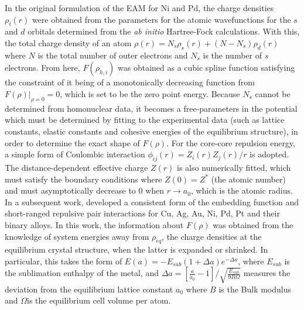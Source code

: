 In the original formulation of the EAM for Ni and Pd,\cite{daw1984embedded}  the  charge densities $\rho_i(r)$ were obtained from the parameters for the atomic wavefunctions for the $s$ and $d$ orbitals determined from the \emph{ab initio} Hartree-Fock calculations.\cite{clementi1974roothaan} With this, the total charge density of an atom $\rho(r)=N_s\rho_s(r)+(N-N_s)\rho_d (r)$ where $N$ is the total number of outer electrons and $N_s$ is the number of $s$ electrons.  From here, $F(\rho_{h,i})$ was obtained as a cubic spline function satisfying the constraint of it being of a monotonically decreasing function from $F(\rho)\vert_{\rho=0}=0$, which is set to be the zero point energy. Because  $N_s$ cannot be determined from homonuclear data, it becomes a free-parameters in the potential which must be determined by fitting to the experimental data (such as lattice constants, elastic constants and cohesive energies of the equilibrium structure), in order to determine the exact shape of $F(\rho)$. For the core-core repulsion energy, a simple form of Coulombic interaction $\phi_{ij}(r)=Z_i(r)Z_j(r)/r$ is adopted. The distance-dependent effective charge $Z(r)$ is also numerically fitted, which must satisfy the boundary conditions where $Z(0)=Z^{*}$ (the atomic number) and must asymptotically decrease to 0 when $r\to a_0$, which is the atomic radius. In a subsequent work, \citet{foiles1986embedded} developed a consistent form of the embedding function and short-ranged repulsive pair interactions for Cu, Ag, Au, Ni, Pd, Pt and their binary alloys. In this work, the information about $F(\rho)$ was obtained from the knowledge of system energies away from $\rho_{eq}$, the charge densities at the equilibrium crystal structure, when the latter is expanded or shrinked. In particular, this takes the form of $E(a)=-E_{sub}(1+\Delta a)e^{-\Delta a}$, where $E_{sub}$ is the sublimation enthalpy of the metal, and $\Delta a=\left[\frac{a}{a_{0}}-1\right]/\sqrt{\frac{E_{sub}}{9B\Omega}}$ measures the deviation from the equilibrium lattice constant $a_{0}$ where $B$ is the Bulk modulus and $\Omega$is the equilibrium cell volume per atom. 

